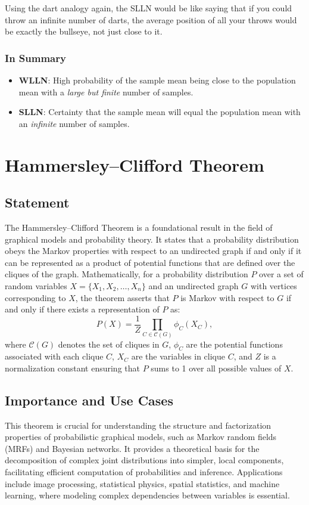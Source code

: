 \documentclass{article}
\begin{document}
Using the dart analogy again, the SLLN would be like saying that if you could throw an infinite number of darts, the average position of all your throws would be exactly the bullseye, not just close to it.

\subsubsection{In Summary}
\begin{itemize}
    \item \textbf{WLLN}: High probability of the sample mean being close to the population mean with a \textit{large but finite} number of samples.
    \item \textbf{SLLN}: Certainty that the sample mean will equal the population mean with an \textit{infinite} number of samples.
\end{itemize}

\section{Hammersley–Clifford Theorem}

\subsection{Statement}
The Hammersley–Clifford Theorem is a foundational result in the field of graphical models and probability theory. It states that a probability distribution obeys the Markov properties with respect to an undirected graph if and only if it can be represented as a product of potential functions that are defined over the cliques of the graph. Mathematically, for a probability distribution \(P\) over a set of random variables \(X = \{X_1, X_2, \ldots, X_n\}\) and an undirected graph \(G\) with vertices corresponding to \(X\), the theorem asserts that \(P\) is Markov with respect to \(G\) if and only if there exists a representation of \(P\) as:
\[ P(X) = \frac{1}{Z} \prod_{C \in \mathcal{C}(G)} \phi_C(X_C), \]
where \(\mathcal{C}(G)\) denotes the set of cliques in \(G\), \(\phi_C\) are the potential functions associated with each clique \(C\), \(X_C\) are the variables in clique \(C\), and \(Z\) is a normalization constant ensuring that \(P\) sums to 1 over all possible values of \(X\).

\subsection{Importance and Use Cases}
This theorem is crucial for understanding the structure and factorization properties of probabilistic graphical models, such as Markov random fields (MRFs) and Bayesian networks. It provides a theoretical basis for the decomposition of complex joint distributions into simpler, local components, facilitating efficient computation of probabilities and inference. Applications include image processing, statistical physics, spatial statistics, and machine learning, where modeling complex dependencies between variables is essential.
\end{document}
